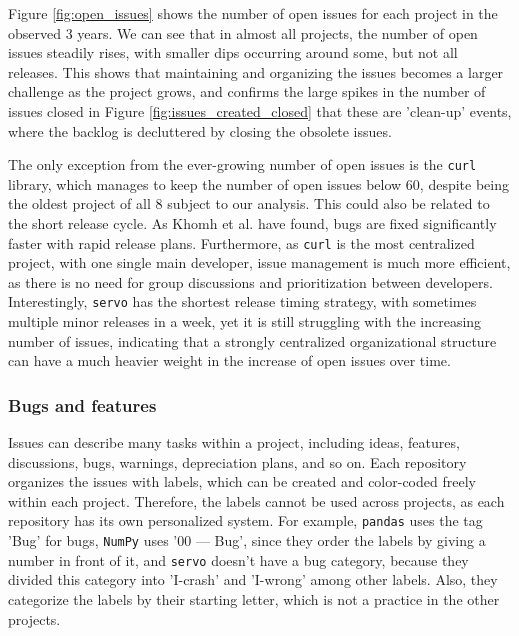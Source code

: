 Figure \ref{fig:open_issues} shows the number of open issues for each project in the observed 3 years. We can see that in almost all projects, the number of open issues steadily rises, with smaller dips occurring around some, but not all releases. This shows that maintaining and organizing the issues becomes a larger challenge as the project grows, and confirms the large spikes in the number of issues closed in Figure \ref{fig:issues_created_closed} that these are 'clean-up' events, where the backlog is decluttered by closing the obsolete issues.

The only exception from the ever-growing number of open issues is the \texttt{curl} library, which manages to keep the number of open issues below 60, despite being the oldest project of all 8 subject to our analysis. This could also be related to the short release cycle. As Khomh et al. \cite{khomhFasterReleasesImprove2012} have found, bugs are fixed significantly faster with rapid release plans. Furthermore, as \texttt{curl} is the most centralized project, with one single main developer, issue management is much more efficient, as there is no need for group discussions and prioritization between developers. Interestingly, \texttt{servo} has the shortest release timing strategy, with sometimes multiple minor releases in a week, yet it is still struggling with the increasing number of issues, indicating that a strongly centralized organizational structure can have a much heavier weight in the increase of open issues over time.

\subsubsection{Bugs and features}
\label{sec:bugs-features}
Issues can describe many tasks within a project, including ideas, features, discussions, bugs, warnings, depreciation plans, and so on. Each repository organizes the issues with labels, which can be created and color-coded freely within each project. Therefore, the labels cannot be used across projects, as each repository has its own personalized system. For example, \texttt{pandas} uses the tag 'Bug' for bugs, \texttt{NumPy} uses '00 — Bug', since they order the labels by giving a number in front of it, and \texttt{servo} doesn't have a bug category, because they divided this category into 'I-crash' and 'I-wrong' among other labels. Also, they categorize the labels by their starting letter, which is not a practice in the other projects.

